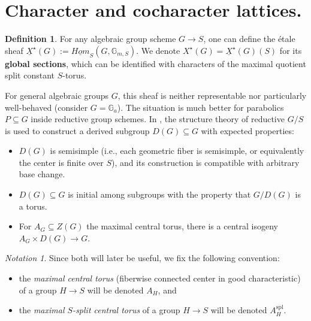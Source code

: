 \documentclass[openany]{amsbook}
\theoremstyle{definition}
\newtheorem{definition}[theorem]{Definition}
\theoremstyle{remark}
\newtheorem{notation}[theorem]{Notation}
\numberwithin{equation}{section}
\newcommand{\G}{\mathbb{G}}
\newcommand{\ul}[1]{\underline{#1}}
\renewcommand{\-}{\operatorname{-}}
\newcommand{\spl}{\mathrm{spl}}
\begin{document}
\section{Character and cocharacter lattices.}
\begin{definition}
    For any algebraic group scheme $G \to S$, one can define the \'etale sheaf $\ul{X}^\star(G) := \ul{Hom}_S(G, \G_{m,S})$. We denote $X^\star(G) = \ul{X}^\star(G)(S)$ for its \textbf{global sections}, which can be identified with characters of the maximal quotient split constant $S$-torus.
\end{definition}




For general algebraic groups $G$, this sheaf is neither representable nor particularly well-behaved (consider $G = \G_a$). The situation is much better for parabolics $P \subseteq G$ inside reductive group schemes. In \cite[Thm. 5.3.1]{conradrgs}, the structure theory of reductive $G/S$ is used to construct a derived subgroup $D(G) \subseteq G$ with expected properties: 
\begin{itemize}
    \item $D(G)$ is semisimple (i.e., each geometric fiber is semisimple, or equivalently the center is finite over $S$), and its construction is compatible with arbitrary base change.
    \item $D(G) \subseteq G$ is initial among subgroups with the property that $G/D(G)$ is a torus.
    \item For $A_G \subseteq Z(G)$ the maximal central torus, there is a central isogeny $A_G \times D(G) \to G$.
\end{itemize}

\begin{notation}
    Since both will later be useful, we fix the following convention:
    \begin{itemize}
        \item the \textit{maximal central torus} (fiberwise connected center in good characteristic) of a group $H \to S$ will be denoted $A_H$, and
        \item the \textit{maximal $S$-\emph{split} central torus} of a group $H \to S$ will be denoted $A_H^{\spl}$.
    \end{itemize}
\end{notation}
\end{document}
